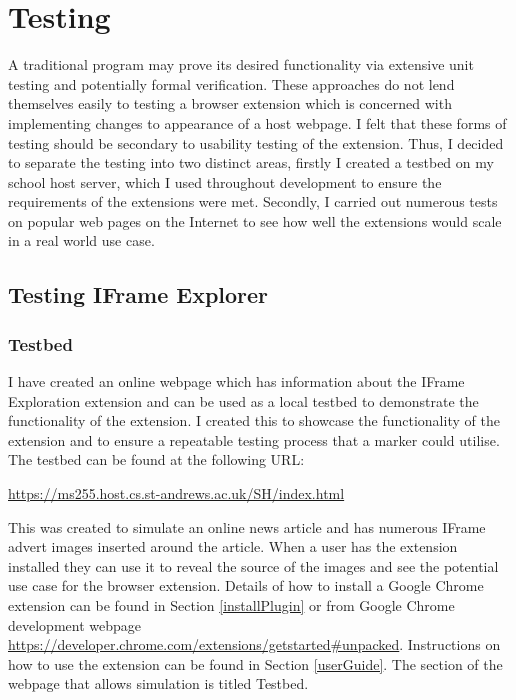 \documentclass[12pt]{article}
\begin{document}
\pagebreak

\section{Testing} \label{testing}
A traditional program may prove its desired functionality via extensive unit testing and potentially formal verification. These approaches do not lend themselves easily to testing a browser extension which is concerned with implementing changes to appearance of a host webpage. I felt that these forms of testing should be secondary to usability testing of the extension. Thus, I decided to separate the testing into two distinct areas, firstly I created a testbed on my school host server, which I used throughout development to ensure the requirements of the extensions were met. Secondly, I carried out numerous tests on popular web pages on the Internet to see how well the extensions would scale in a real world use case. 

\subsection{Testing IFrame Explorer}

\subsubsection{Testbed}
I have created an online webpage which has information about the IFrame Exploration extension and can be used as a local testbed to demonstrate the functionality of the extension. I created this to showcase the functionality of the extension and to ensure a repeatable testing process that a marker could utilise. The testbed can be found at the following URL: 

\begin{center}
\url{https://ms255.host.cs.st-andrews.ac.uk/SH/index.html}
\end{center}

This was created to simulate an online news article and has numerous IFrame advert images inserted around the article. When a user has the extension installed they can use it to reveal the source of the images and see the potential use case for the browser extension. Details of how to install a Google Chrome extension can be found in Section \ref{installPlugin} or from Google Chrome development webpage \url{https://developer.chrome.com/extensions/getstarted#unpacked}. Instructions on how to use the extension can be found in Section \ref{userGuide}. The section of the webpage that allows simulation is titled Testbed. 
\end{document}
